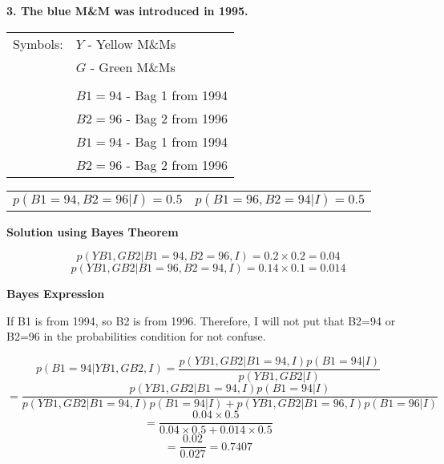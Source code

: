 \documentclass[a4paper, 12pt]{article}
\begin{document}
\begin{flushleft}
\textbf{3. The blue M\&M was introduced in 1995. }

\begin{table}[ht]
    \centering
    \begin{tabular}{l l}
        Symbols: & $Y$ - Yellow M\&Ms  \\
                    & $G$ - Green M\&Ms\\
										& \\
										& $B1=94$ - Bag 1 from 1994 \\
                    & $B2=96$ - Bag 2 from 1996 \\
										& $B1=94$ - Bag 1 from 1994 \\
										& $B2=96$ - Bag 2 from 1996 \\
    \end{tabular}
    \label{tab:hypdata}
\end{table}


\begin{table}[ht]
    \centering
    \begin{tabular}{l l}
        $ p(B1=94, B2=96 | I) = 0.5 $    & $ p(B1=96, B2=94 | I) = 0.5  $ \\
    \end{tabular}
\end{table}

\textbf{Solution using Bayes Theorem}

$$ p(YB1, GB2 | B1=94, B2=96, I ) = 0.2 \times 0.2 = 0.04 $$
$$ p(YB1, GB2 | B1=96, B2=94, I ) = 0.14 \times 0.1 = 0.014 $$

\textbf{Bayes Expression}

If B1 is from 1994, so B2 is from 1996. Therefore, I will not put that B2=94 or B2=96 in the probabilities condition for not confuse.


$$ p(B1=94 | Y B1, G B2, I) = \frac{p(YB1, G B2 | B1=94, I)p(B1=94 | I)}{p(Y B1, G B2|I)} $$
$$ = \frac{p(YB1, G B2 | B1=94, I)p(B1=94 | I)}{p(YB1, GB2 | B1=94,I)p(B1=94 | I) + p(YB1, G B2 | B1=96, I)p(B1=96| I)} $$
$$ = \frac{0.04 \times 0.5}{0.04 \times 0.5 + 0.014 \times0.5 } $$
$$ = \frac{0.02}{0.027} = 0.7407	  $$



\end{flushleft}
\end{document}
